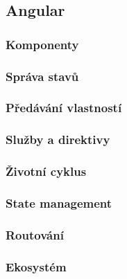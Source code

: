 \subsection{Angular}

\subsubsection{Komponenty}

\subsubsection{Správa stavů}

\subsubsection{Předávání vlastností}

\subsubsection{Služby a direktivy}

\subsubsection{Životní cyklus}

\subsubsection{State management}

\subsubsection{Routování}

\subsubsection{Ekosystém}